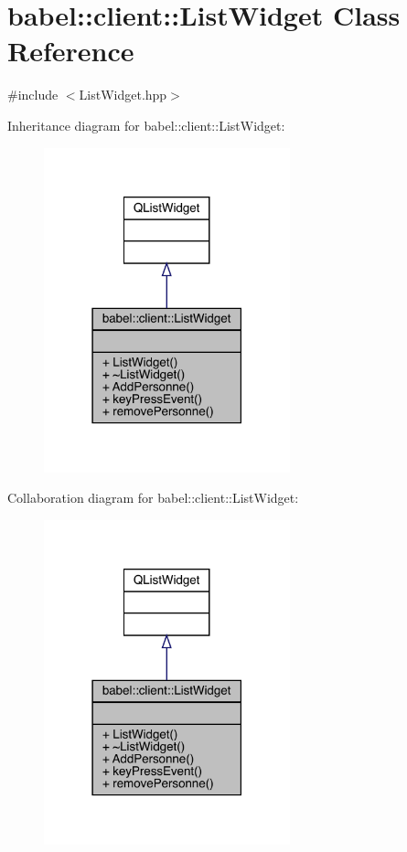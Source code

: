 \hypertarget{classbabel_1_1client_1_1_list_widget}{}\section{babel\+:\+:client\+:\+:List\+Widget Class Reference}
\label{classbabel_1_1client_1_1_list_widget}


{\ttfamily \#include $<$List\+Widget.\+hpp$>$}



Inheritance diagram for babel\+:\+:client\+:\+:List\+Widget\+:\nopagebreak
\begin{figure}[H]
\begin{center}
\leavevmode
\includegraphics[width=202pt]{classbabel_1_1client_1_1_list_widget__inherit__graph}
\end{center}
\end{figure}


Collaboration diagram for babel\+:\+:client\+:\+:List\+Widget\+:\nopagebreak
\begin{figure}[H]
\begin{center}
\leavevmode
\includegraphics[width=202pt]{classbabel_1_1client_1_1_list_widget__coll__graph}
\end{center}
\end{figure}
